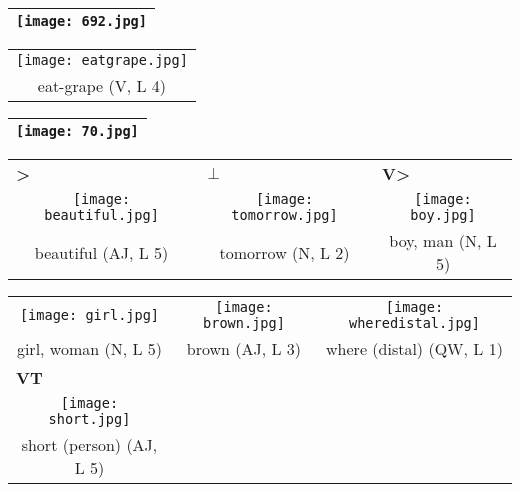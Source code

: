 \documentclass{tufte-book}
\newcommand{\sansnormal}{\sffamily\selectfont}
\begin{document}
\begin{fullwidth}
\begin{table*}[h!]
\begin{tabular}{cc}
 
 
 
\end{tabular}
\end{table*}%

\begin{table}[h!]
\begin{tabular}{|c|}
\hline
\texttt{[image: 692.jpg]}\\
 
 \hline
\end{tabular}
\label{page:692}
\end{table}

 \begin{table*}[h!]
\begin{tabular}{c}
   \texttt{[image: eatgrape.jpg]}\\
   eat-grape (V, L 4)  \\%
  
 
 
 
\end{tabular}
\end{table*}
\begin{table}[h!]
\begin{tabular}{|c|}
\hline
\texttt{[image: 70.jpg]}\\
 
 \hline
\end{tabular}
\label{page:70}
\end{table}

 \begin{table*}[h!]
\begin{tabular}{ccc}
 \multicolumn{1}{l}{\textbf{ >}}&\multicolumn{1}{l}{$\pmb\perp$}&  \multicolumn{1}{l}{\textbf{{\sansnormal V}>}} \\
   \texttt{[image: beautiful.jpg]}& \texttt{[image: tomorrow.jpg]}&  \texttt{[image: boy.jpg]}\\
   beautiful (AJ, L 5) & tomorrow (N, L 2)& boy, man (N, L 5)\\%
  \end{tabular}
\end{table*}
\newpage

 \begin{table*}[h!]
\begin{tabular}{ccc}
     \texttt{[image: girl.jpg]}& \texttt{[image: brown.jpg]}&  \texttt{[image: wheredistal.jpg]}\\
   girl, woman (N, L 5) & brown (AJ, L 3)& where (distal) (QW, L 1)\\
\multicolumn{1}{l}{\sansnormal\textbf{VT}}& &\\
   \texttt{[image: short.jpg]}& &\\
   short (person) (AJ, L 5) & &\\
 \end{tabular}
\end{table*}


\end{fullwidth}
\end{document}

